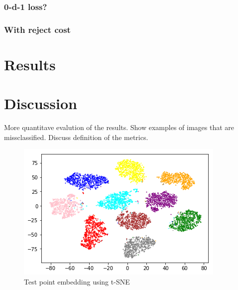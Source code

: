 \documentclass{article}
\begin{document}
\subsubsection{0-d-1 loss?}
\subsubsection{With reject cost}

\section{Results}

\section{Discussion}
More quantitave evalution of the results.
Show examples of images that are missclassified.
Discuss definition of the metrics.
\begin{figure}[h]
	\centering
	\includegraphics{embeddings_visualisation.png}
	\caption{Test point embedding using t-SNE}
\end{figure}

\small



\end{document}
